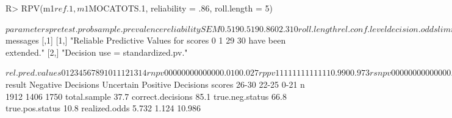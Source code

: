 \documentclass[
  nojss]{jss}
\begin{document}
\begin{CodeChunk}

\begin{CodeInput}
R> RPV(m1$ref.1, m1$MOCATOTS.1, reliability = .86, roll.length = 5)
\end{CodeInput}

\begin{CodeOutput}
$parameters
     pretest.prob sample.prevalence       reliability               SEM 
            0.519             0.519             0.860             2.310 
      roll.length    rel.conf.level     decision.odds             limit 
            5.000             0.613             2.000             0.667 

$messages
     [,1]                                                                   
[1,] "Reliable Predictive Values for scores  0 1 29 30  have been extended."
[2,] "Decision use = standardized.pv."                                      

$rel.pred.values
           0   1   2   3   4   5   6   7   8   9  10  11  12     13     14
rnpv       0   0   0   0   0   0   0   0   0   0   0   0   0  0.010  0.027
rppv       1   1   1   1   1   1   1   1   1   1   1   1   1  0.990  0.973
rsnpv      0   0   0   0   0   0   0   0   0   0   0   0   0  0.011  0.029
rsppv      1   1   1   1   1   1   1   1   1   1   1   1   1  0.989  0.971
rilr     Inf Inf Inf Inf Inf Inf Inf Inf Inf Inf Inf Inf Inf 88.157 33.319
rpt.odds Inf Inf Inf Inf Inf Inf Inf Inf Inf Inf Inf Inf Inf 95.250 36.000
rpt.prob   1   1   1   1   1   1   1   1   1   1   1   1   1  0.990  0.973
             15     16     17    18    19    20    21    22    23    24
rnpv      0.048  0.065  0.081 0.115 0.143 0.176 0.256 0.355 0.434 0.530
rppv      0.952  0.935  0.919 0.885 0.857 0.824 0.744 0.645 0.566 0.470
rsnpv     0.051  0.070  0.086 0.123 0.153 0.188 0.271 0.373 0.453 0.549
rsppv     0.949  0.930  0.914 0.877 0.847 0.812 0.729 0.627 0.547 0.451
rilr     18.548 13.296 10.561 7.126 5.553 4.332 2.690 1.678 1.209 0.821
rpt.odds 20.040 14.366 11.411 7.699 6.000 4.681 2.907 1.813 1.307 0.887
rpt.prob  0.952  0.935  0.919 0.885 0.857 0.824 0.744 0.645 0.566 0.470
            25    26    27    28    29    30
rnpv     0.643 0.729 0.784 0.851 0.851 0.851
rppv     0.357 0.271 0.216 0.149 0.149 0.149
rsnpv    0.660 0.744 0.796 0.861 0.861 0.861
rsppv    0.340 0.256 0.204 0.139 0.139 0.139
rilr     0.514 0.344 0.256 0.161 0.161 0.161
rpt.odds 0.556 0.372 0.276 0.174 0.174 0.174
rpt.prob 0.357 0.271 0.216 0.149 0.149 0.149

$result
                  Negative Decisions Uncertain Positive Decisions
scores            26-30              22-25     0-21              
n                 1912               1406      1750              
total.sample      37.7%
correct.decisions 85.1%
true.neg.status   66.8%
true.pos.status   10.8%
realized.odds     5.732              1.124     10.986            
\end{CodeOutput}
\end{CodeChunk}
\end{document}
